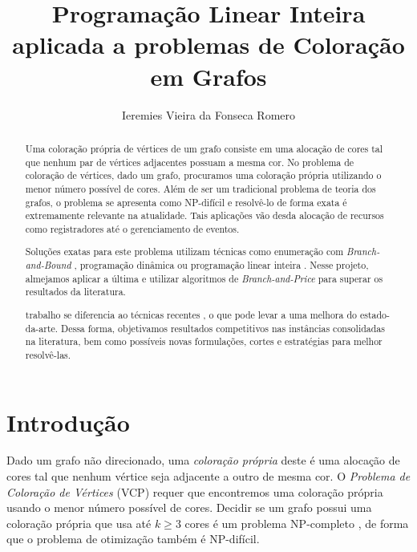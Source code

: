\documentclass[11pt]{article}
\author{Ieremies Vieira da Fonseca Romero}
\date{}
\title{Programação Linear Inteira aplicada a problemas de Coloração em Grafos}
\providecommand{\DIFaddtex}[1]{{\protect\color{blue}{#1}}} %
\providecommand{\DIFaddbegin}{} %
\providecommand{\DIFaddend}{} %
\providecommand{\DIFadd}[1]{\texorpdfstring{\DIFaddtex{#1}}{#1}} %
\newcommand{\DIFaddincludegraphics}[2][]{{\color{blue}\fbox{\DIFOincludegraphics[#1]{#2}}}} %
\DeclareRobustCommand{\DIFaddbegin}{\DIFOaddbegin \let\includegraphics\DIFaddincludegraphics} %
\DeclareRobustCommand{\DIFaddend}{\DIFOaddend \let\includegraphics\DIFOincludegraphics} %
\begin{document}
\maketitle
\begin{abstract}
Uma coloração própria de vértices de um grafo consiste em uma alocação de cores tal que nenhum par de vértices adjacentes possuam a mesma cor.
No problema de coloração de vértices, dado um grafo, procuramos uma coloração própria utilizando o menor número possível de cores.
Além de ser um tradicional problema de teoria dos grafos, o problema se apresenta como NP-difícil e resolvê-lo de forma exata é extremamente relevante na atualidade.
Tais aplicações vão desda alocação de recursos como registradores até o gerenciamento de eventos.

Soluções exatas para este problema utilizam técnicas como enumeração com \emph{Branch-and-Bound} \autocite{Furini2016ImprovedDSATURBased}, programação dinâmica  \DIFaddbegin \autocites{Eppstein2003SmallMaximalIndependent}[][]{Byskov2002ChromaticNumberTime} \DIFaddend ou programação linear inteira \autocites{Mehrotra1996ColumnGenerationApproach}[][]{Held2012Maximumweightstable}.
Nesse projeto, almejamos aplicar a última e utilizar algoritmos de \emph{Branch-and-Price} para superar os resultados da literatura.
 \DIFaddbegin 

\DIFadd{Nosso }\DIFaddend trabalho se diferencia ao \DIFaddbegin\DIFadd{adaptar} \DIFaddend técnicas recentes  \DIFaddbegin \DIFadd{em }\emph{\DIFadd{branch-and-price}} \autocites{Pessoa2021SolvingBinPacking}[][]{Lima2022Exactsolutionnetwork} \DIFadd{cuja eficácia já foi demonstrada em outros problemas, bem como desenvolver novas técnicas advindas desta aplicação}\DIFaddend , o que pode levar a uma melhora do estado-da-arte.
Dessa forma, objetivamos resultados competitivos nas instâncias consolidadas na literatura, bem como possíveis novas formulações, cortes e estratégias para melhor resolvê-las.
\end{abstract}

\section{Introdução}
 \DIFaddbegin \label{sec:org9851288}
\DIFaddend Dado um grafo não direcionado, uma \emph{coloração própria} deste é uma alocação de cores tal que nenhum vértice seja adjacente a outro de mesma cor.
O \emph{Problema de Coloração de Vértices} (VCP) requer que encontremos uma coloração própria usando o menor número possível de cores.
Decidir se um grafo possui uma coloração própria que usa até \(k \geq 3\) cores é um problema NP-completo \autocite{Garey1979ComputersIntractabilityGuide}, de forma que o problema de otimização também é NP-difícil.
\end{document}
